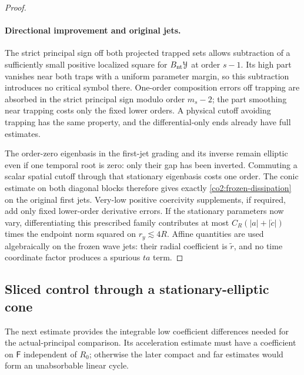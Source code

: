 \begin{proof}
\paragraph{Directional improvement and original jets.}
The strict principal sign off both projected trapped sets allows subtraction
of a sufficiently small positive localized square for
$B_{\rm nt}\mathcal Y$ at order $s-1$.  Its high part vanishes near both
traps with a uniform parameter margin, so this subtraction introduces no
critical symbol there.  One-order composition errors off trapping are
absorbed in the strict principal sign modulo order $m_s-2$; the part
smoothing near trapping costs only the fixed lower orders.  A physical
cutoff avoiding trapping has the same property, and the differential-only
ends already have full estimates.

The order-zero eigenbasis in the first-jet grading and its inverse remain
elliptic even if one temporal root is zero: only their gap has been inverted.
Commuting a scalar spatial cutoff through that stationary eigenbasis costs
one order.  The conic estimate on both diagonal blocks therefore gives
exactly \eqref{co2:frozen-dissipation} on the original first jets.  Very-low
positive coercivity supplements, if required, add only fixed lower-order
derivative errors.  If the stationary parameters now vary, differentiating
this prescribed family contributes at most
$C_R(|a|+|\dot c|)$ times the endpoint norm squared on $r_y\lesssim4R$.
Affine quantities are used algebraically on the frozen wave jets: their
radial coefficient is $\widetilde r$, and no time coordinate factor produces
a spurious $ta$ term.
\end{proof}

\subsection{Sliced control through a stationary-elliptic cone}

The next estimate provides the integrable low coefficient differences needed
for the actual-principal comparison.  Its acceleration estimate must have a
coefficient on $\mathsf F$ independent of $R_0$; otherwise the later compact
and far estimates would form an unabsorbable linear cycle.

